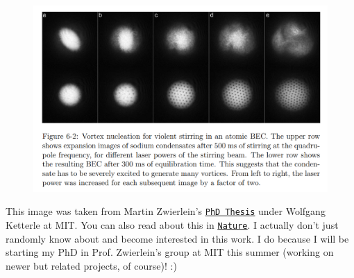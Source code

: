 \documentclass[11pt]{article}
\begin{document}
\begin{figure}[!htb]
	\centering
	\includegraphics[scale=0.4]{BEC_vortex}
\end{figure}

This image was taken from Martin Zwierlein's \href{https://www.rle.mit.edu/cua_pub/ketterle_group/Theses/Zwierlein_Thesis_Adobe7.pdf}{\underline{\texttt{PhD Thesis}}} under Wolfgang Ketterle at MIT. You can also read about this in \href{https://www.nature.com/articles/nature03858}{\underline{\texttt{Nature}}}. I actually don't just randomly know about and become interested in this work. I do because I will be starting my PhD in Prof. Zwierlein's group at MIT this summer (working on newer but related projects, of course)! :) 












  
\end{document}
